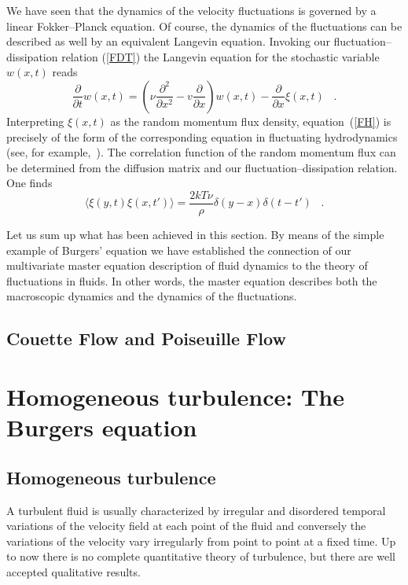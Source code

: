 We have seen that the dynamics of the velocity
fluctuations is governed by a linear Fokker--Planck equation.
Of course, the dynamics of the fluctuations can be described as well by
an equivalent Langevin equation.
Invoking our fluctuation--dissipation relation (\ref{FDT})
the Langevin equation for the
stochastic variable $w(x,t)$ reads
\begin{equation}
\label{FH}
\frac{\partial}{\partial t} w(x,t) =
 \left( \nu \frac{\partial^2}{\partial x^2} -
         v \frac{\partial}{\partial x} \right) w(x,t) -
         \frac{\partial}{\partial x} \xi(x,t)
\;\;\; .
\end{equation}
Interpreting $\xi (x,t)$ as the random momentum flux density,
equation~(\ref{FH}) is precisely of the form
of the corresponding equation in fluctuating hydrodynamics (see, for
example,~\cite{GRABERT,FOX}).
The correlation function of the
random momentum flux  can be determined from the diffusion
matrix and our fluctuation--dissipation relation. One finds
\begin{equation}                                 \label{CORRF}
\langle \xi (y,t) \xi (x,t') \rangle = \frac{2kT \nu}{\rho}
              \delta (y-x) \delta (t-t')
\;\;\; .
\end{equation}

Let us sum up what has been achieved in this section. By means of
the simple example of Burgers' equation we have established the connection
of our multivariate master equation description of fluid dynamics to
the theory of fluctuations in fluids. In other words,
the master equation describes both the macroscopic dynamics and the
dynamics of the fluctuations.

\subsection{Couette Flow and Poiseuille Flow}


\section{Homogeneous turbulence: The Burgers equation}
\subsection{Homogeneous turbulence}
A turbulent fluid is usually characterized by irregular and disordered
temporal variations of the velocity field at each point of the fluid and
conversely  the variations of the velocity vary irregularly from point to
point at a fixed time. Up to now there is no complete quantitative theory of
turbulence, but there are well accepted  qualitative results.

